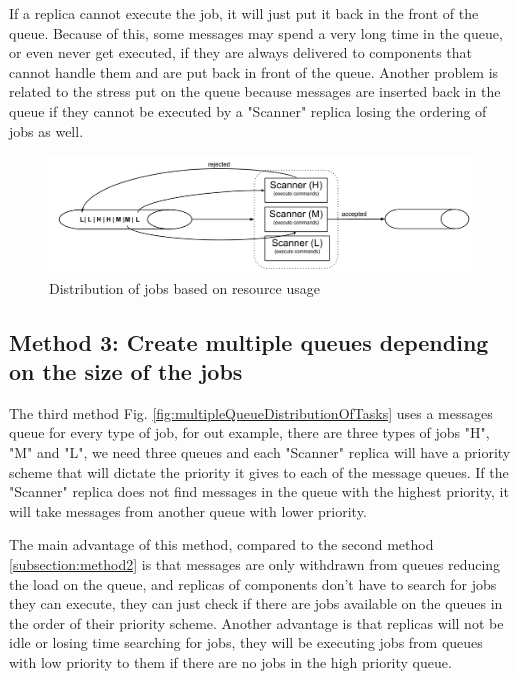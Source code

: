 If a replica cannot execute the job, it will just put it back in the front of the queue. Because of this, some messages may spend a very long time in the queue, or even never get executed, if they are always delivered to components that cannot handle them and are put back in front of the queue. Another problem is related to the stress put on the queue  because messages are inserted back in the queue if they cannot be executed by a "Scanner" replica losing the ordering of jobs as well.

\begin{figure}[ht]
\centering
\includegraphics[width=\linewidth]{./img/2_PriorityLoadBalancing.png}
\caption{Distribution of jobs based on resource usage}
\label{fig:sizeBaseDistributionOftasks}
\end{figure}


\subsection{Method 3: Create multiple queues depending on the size of the jobs}
\label{subsection:method3}
The third method Fig. \ref{fig:multipleQueueDistributionOfTasks} uses a messages queue for every type of job, for out example, there are three types of jobs "H", "M" and "L", we need three queues and each "Scanner" replica will have a priority scheme that will dictate the priority it gives to each of the message queues. If the "Scanner" replica does not find messages in the queue with the highest priority, it will take messages from another queue with lower priority. 

The main advantage of this method, compared to the second method \ref{subsection:method2} is that messages are only withdrawn from queues reducing the load on the queue, and replicas of components don't have to search for jobs they can execute, they can just check if there are jobs available on the queues in the order of their priority scheme. Another advantage is that replicas will not be idle or losing time searching for jobs, they will be executing jobs from queues with low priority to them if there are no jobs in the high priority queue.

